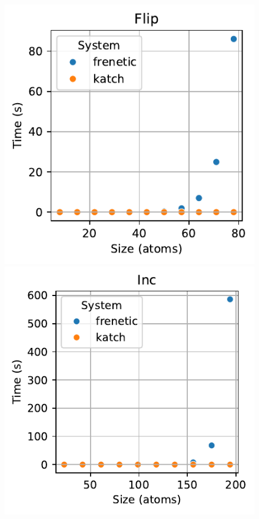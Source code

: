 \documentclass[acmsmall,dvipsnames,nonacm]{acmart}
\begin{document}
\begin{figure}
    \includegraphics[scale=0.53]{plots/Flip_time_vs_size.pdf}
    \includegraphics[scale=0.53]{plots/Inc_time_vs_size.pdf}

\end{figure}
\end{document}

